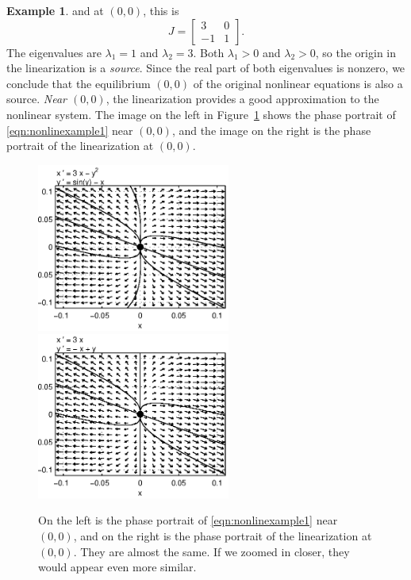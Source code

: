 \documentclass[reqno]{immbook}
\numberwithin{equation}{chapter}
\numberwithin{question}{section}
\numberwithin{theorem}{chapter}
\numberwithin{figure}{chapter}
\theoremstyle{definition}
\newtheorem{example}{Example}[section]
\begin{document}
\begin{example}
and at $(0,0)$, this is
\begin{equation}
  J = \begin{bmatrix}
           3 &  0 \\
	   -1 & 1
      \end{bmatrix}.
\end{equation}
The eigenvalues are $\lambda_1=1$ and $\lambda_2=3$.
Both $\lambda_1>0$ and $\lambda_2>0$, so the origin
in the linearization is a \emph{source}.
Since the real part of both eigenvalues is nonzero,
we conclude that the equilibrium $(0,0)$ of the original
nonlinear equations is also a source.
\emph{Near $(0,0)$}, the linearization provides a
good approximation to the nonlinear system.
The image on the left in Figure~\ref{fig:nonlinexample1compare}
shows the phase portrait of \eqref{eqn:nonlinexample1}
near $(0,0)$, and the image on the right
is the phase portrait of the linearization at $(0,0)$.
\begin{figure}
\centerline{%
\includegraphics[width=2.5in]{pplane_plots/NonlinExample1detail.ps}
\includegraphics[width=2.5in]{pplane_plots/NonlinExample1lin.ps}
}
\caption{On the left is the phase portrait of
\eqref{eqn:nonlinexample1} near $(0,0)$, and on the
right is the phase portrait of the linearization
at $(0,0)$.  They are almost the same.  If we zoomed
in closer, they would appear even more similar.}
\label{fig:nonlinexample1compare}
\end{figure}
\end{example}
\end{document}
